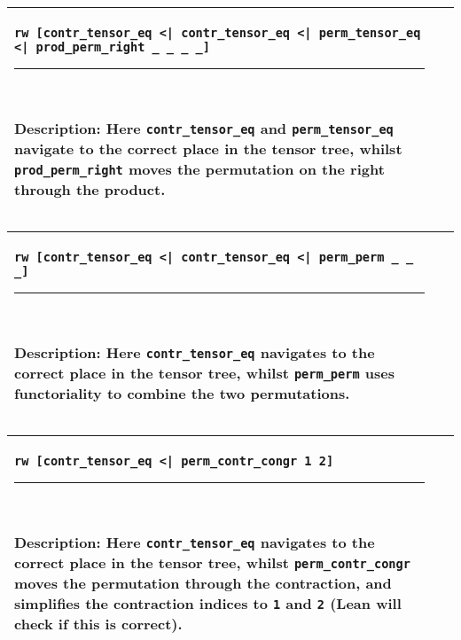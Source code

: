 \documentclass[a4paper, 11pt]{article}
\newcommand{\proofstep}[3]{
  \arrayrulecolor{mycolor}
\begin{center}
\begin{tabular}{|p{3in}| p{3in}|}
\hline
{#1
}\newline 
\hrule~\newline
#2
  & ~\newline
\makebox[3in]{%
#3}
  \\ \hline
\end{tabular}
\end{center}
\arrayrulecolor{black}
}
\begin{document}
\proofstep{\lstinline!rw [contr_tensor_eq <| contr_tensor_eq <| perm_tensor_eq <| prod_perm_right _ _ _ _]!}{
  Description: Here \lstinline|contr_tensor_eq| and \lstinline|perm_tensor_eq| navigate to the correct place in the tensor tree,
  whilst \lstinline|prod_perm_right| moves the permutation on the right through the product.
}{
  \begin{tikzpicture}
    \node[draw=black] (A) at (0,0) {contr 0 0};
    \node[draw=black] (B) at (0,-1) {contr 0 1};
    \node[draw=black] (C) at (0,-2) {perm};
    \node[draw=red] (D) at (0,-3) {perm};
    \node[draw=red] (E) at (0,-4) {prod};
    \node[draw=black] (F1) at (-1,-5) {neg};
    \node[draw=black] (G1) at (-1,-6) {A};
    \node[draw=black] (F2) at (1,-5) {S};
    \path [->] (A) edge (B);
    \path [->] (B) edge (C);
    \path [->] (C) edge (D);
    \path [->, color = red] (D) edge (E);
    \path [->] (E) edge (F1);
    \path [->, color = red] (E) edge (F2);
    \path [->] (F1) edge (G1);
  \end{tikzpicture}
}

\proofstep{\lstinline!rw [contr_tensor_eq <| contr_tensor_eq <| perm_perm _ _ _]!}{
  Description: Here \lstinline|contr_tensor_eq| navigates to the correct place in the tensor tree,
  whilst \lstinline|perm_perm| uses functoriality to combine the two permutations.
}{
  \begin{tikzpicture}
    \node[draw=black] (A) at (0,0) {contr 0 0};
    \node[draw=black] (B) at (0,-1) {contr 0 1};
    \node[draw=red] (C) at (0,-2) {perm};
    \node[draw=black] (D) at (0,-3) {prod};
    \node[draw=black] (E1) at (-1,-4) {neg};
    \node[draw=black] (F1) at (-1,-5) {A};
    \node[draw=black] (E2) at (1,-4) {S};
    \path [->] (A) edge (B);
    \path [->] (B) edge (C);
    \path [->] (C) edge (D);
    \path [->] (D) edge (E1);
    \path [->] (D) edge (E2);
    \path [->] (E1) edge (F1);
  \end{tikzpicture}
}

\proofstep{\lstinline!rw [contr_tensor_eq <| perm_contr_congr 1 2]!}{
  Description: Here \lstinline|contr_tensor_eq| navigates to the correct place in the tensor tree,
  whilst \lstinline|perm_contr_congr| moves the permutation through the contraction, and simplifies the contraction
  indices to \lstinline|1| and \lstinline|2| (Lean will check if this is correct).
}{
  \begin{tikzpicture}
    \node[draw=black] (A) at (0,0) {contr 0 0};
    \node[draw=red] (B) at (0,-1) {perm};
    \node[draw=red] (C) at (0,-2) {contr 1 2};
    \node[draw=black] (D) at (0,-3) {prod};
    \node[draw=black] (E1) at (-1,-4) {neg};
    \node[draw=black] (F1) at (-1,-5) {A};
    \node[draw=black] (E2) at (1,-4) {S};
    \path [->] (A) edge (B);
    \path [->, color = red] (B) edge (C);
    \path [->, color = red] (C) edge (D);
    \path [->] (D) edge (E1);
    \path [->] (D) edge (E2);
    \path [->] (E1) edge (F1);
  \end{tikzpicture}
}
\end{document}
